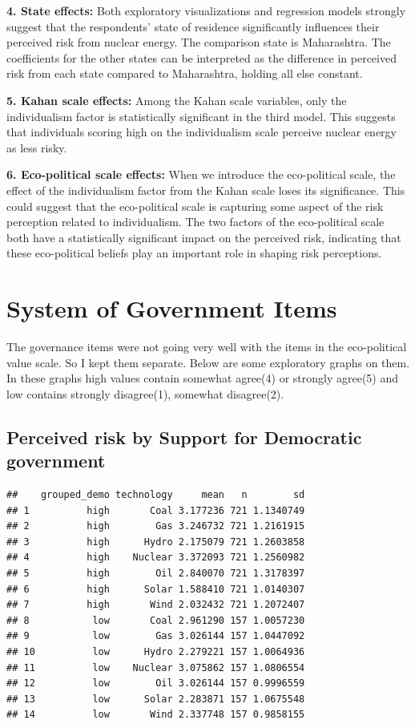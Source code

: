 \documentclass[
]{article}
\begin{document}
\textbf{4. State effects:} Both exploratory visualizations and
regression models strongly suggest that the respondents' state of
residence significantly influences their perceived risk from nuclear
energy. The comparison state is Maharashtra. The coefficients for the
other states can be interpreted as the difference in perceived risk from
each state compared to Maharashtra, holding all else constant.

\textbf{5. Kahan scale effects:} Among the Kahan scale variables, only
the individualism factor is statistically significant in the third
model. This suggests that individuals scoring high on the individualism
scale perceive nuclear energy as less risky.

\textbf{6. Eco-political scale effects:} When we introduce the
eco-political scale, the effect of the individualism factor from the
Kahan scale loses its significance. This could suggest that the
eco-political scale is capturing some aspect of the risk perception
related to individualism. The two factors of the eco-political scale
both have a statistically significant impact on the perceived risk,
indicating that these eco-political beliefs play an important role in
shaping risk perceptions.

\newpage

\hypertarget{system-of-government-items}{%
\section{System of Government Items}\label{system-of-government-items}}

The governance items were not going very well with the items in the
eco-political value scale. So I kept them separate. Below are some
exploratory graphs on them. In these graphs high values contain somewhat
agree(4) or strongly agree(5) and low contains strongly disagree(1),
somewhat disagree(2).

\hypertarget{perceived-risk-by-support-for-democratic-government}{%
\subsection{Perceived risk by Support for Democratic
government}\label{perceived-risk-by-support-for-democratic-government}}

\begin{verbatim}
##    grouped_demo technology     mean   n        sd
## 1          high       Coal 3.177236 721 1.1340749
## 2          high        Gas 3.246732 721 1.2161915
## 3          high      Hydro 2.175079 721 1.2603858
## 4          high    Nuclear 3.372093 721 1.2560982
## 5          high        Oil 2.840070 721 1.3178397
## 6          high      Solar 1.588410 721 1.0140307
## 7          high       Wind 2.032432 721 1.2072407
## 8           low       Coal 2.961290 157 1.0057230
## 9           low        Gas 3.026144 157 1.0447092
## 10          low      Hydro 2.279221 157 1.0064936
## 11          low    Nuclear 3.075862 157 1.0806554
## 12          low        Oil 3.026144 157 0.9996559
## 13          low      Solar 2.283871 157 1.0675548
## 14          low       Wind 2.337748 157 0.9858155
\end{verbatim}
\end{document}
